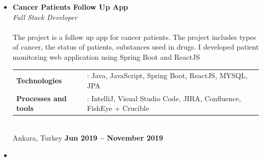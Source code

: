 \documentclass[margin]{res}
\begin{document}
\begin{resume}
\begin{itemize}
    \item 
    \textbf {Cancer Patients Follow Up App} \\
    \textit{Full Stack Developer} \\
    \\
    The project is a follow up app for cancer patients. The project includes types of cancer, the status of patients, substances used in drugs. I developed patient monitoring web application using Spring Boot and ReactJS   \\
    \begin{tabular}{@{} l l}
        \textbf{Technologies} & :   Java, JavaScript, Spring Boot, ReactJS, MYSQL, JPA \\ 
        \textbf{Processes and tools} & :  IntelliJ, Visual Studio Code, JIRA, Confluence, FishEye + Crucible \\
    \end{tabular}
    \\
    Ankara, Turkey
    \hfill {\bf Jun 2019 – November 2019 }\\[0.08in] \newline
\end{itemize}
\begin{itemize}
    \item 

\end{itemize}
\end{resume}
\end{document}
